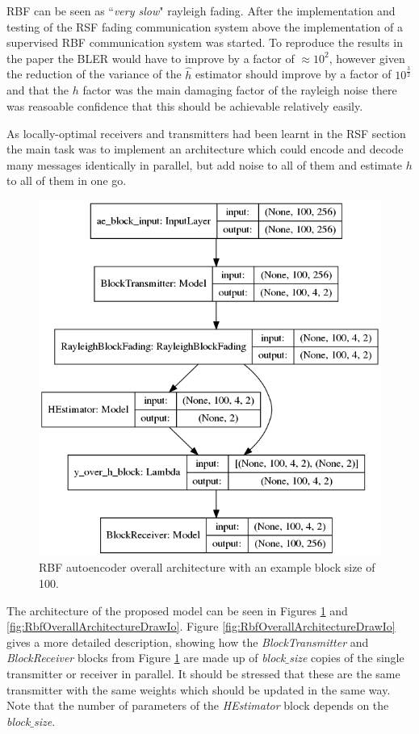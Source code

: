 \documentclass[12pt,onecolumn,letterpaper]{article}
\newcommand{\code}{\textit}
\newcommand\genfigsize{0.5}
\begin{document}
RBF can be seen as ``\textit{very slow}" rayleigh fading. After the implementation and testing of the RSF fading communication system above the implementation of a supervised RBF communication system was started. To reproduce the results in the paper the BLER would have to improve by a factor of $\approx10^2$, however given the reduction of the variance of the $\hat{h}$ estimator should improve by a factor of $10^{\frac{3}{2}}$ and that the $h$ factor was the main damaging factor of the rayleigh noise there was reasoable confidence that this should be achievable relatively easily. 

As locally-optimal receivers and transmitters had been learnt in the RSF section the main task was to implement an architecture which could encode and decode many messages identically in parallel, but add noise to all of them and estimate $h$ to all of them in one go.

\begin{figure}
   \centering
   \includegraphics[width=\genfigsize\linewidth]{figures/aoudia_paper/autoencoder_rbf_10e2.png}
   \caption{RBF autoencoder overall architecture with an example block size of 100.}
   \label{fig:RbfOverallArchitecture}
\end{figure}

The architecture of the proposed model can be seen in Figures \ref{fig:RbfOverallArchitecture} and \ref{fig:RbfOverallArchitectureDrawIo}. Figure \ref{fig:RbfOverallArchitectureDrawIo} gives a more detailed description, showing how the \code{BlockTransmitter} and \code{BlockReceiver} blocks from Figure \ref{fig:RbfOverallArchitecture} are made up of \code{block$\_$size} copies of the single transmitter or receiver in parallel. It should be stressed that these are the same transmitter with the same weights which should be updated in the same way. Note that the number of parameters of the \code{HEstimator} block depends on the \code{block$\_$size}. 
\end{document}
